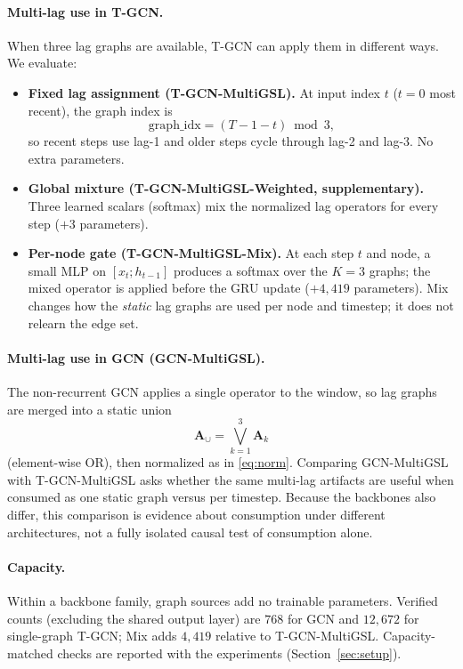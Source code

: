 \paragraph{Multi-lag use in T-GCN.}
When three lag graphs are available, T-GCN can apply them in different
ways. We evaluate:
\begin{itemize}
\item \textbf{Fixed lag assignment (T-GCN-MultiGSL).} At input index $t$
($t=0$ most recent), the graph index is
\begin{equation}\label{eq:lagidx}
\mathrm{graph\_idx}=(T-1-t)\bmod 3,
\end{equation}
so recent steps use lag-1 and older steps cycle through lag-2 and lag-3.
No extra parameters.
\item \textbf{Global mixture (T-GCN-MultiGSL-Weighted, supplementary).}
Three learned scalars (softmax) mix the normalized lag operators for every
step ($+3$ parameters).
\item \textbf{Per-node gate (T-GCN-MultiGSL-Mix).} At each step $t$ and
node, a small MLP on $[x_t;h_{t-1}]$ produces a softmax over the $K=3$
graphs; the mixed operator is applied before the GRU update ($+4{,}419$
parameters). Mix changes how the \emph{static} lag graphs are used per node
and timestep; it does not relearn the edge set.
\end{itemize}

\paragraph{Multi-lag use in GCN (GCN-MultiGSL).}
The non-recurrent GCN applies a single operator to the window, so lag graphs
are merged into a static union
\[
\mathbf{A}_{\cup}=\bigvee_{k=1}^{3}\mathbf{A}_k
\]
(element-wise OR), then normalized as in \eqref{eq:norm}. Comparing
GCN-MultiGSL with T-GCN-MultiGSL asks whether the same multi-lag artifacts
are useful when consumed as one static graph versus per timestep. Because
the backbones also differ, this comparison is evidence about consumption
under different architectures, not a fully isolated causal test of
consumption alone.

\paragraph{Capacity.}
Within a backbone family, graph sources add no trainable parameters.
Verified counts (excluding the shared output layer) are $768$ for GCN and
$12{,}672$ for single-graph T-GCN; Mix adds $4{,}419$ relative to
T-GCN-MultiGSL. Capacity-matched checks are reported with the experiments
(Section~\ref{sec:setup}).

